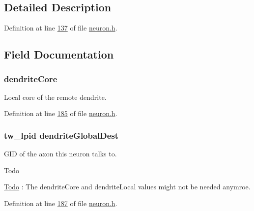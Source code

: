 \subsection{Detailed Description}


Definition at line \hyperlink{neuron_8h_source_l00137}{137} of file \hyperlink{neuron_8h_source}{neuron.\+h}.



\subsection{Field Documentation}
\hypertarget{structneuron_state_a62463fa4d33c39297aa5ce3a145d474f}{}
\subsubsection[{dendrite\+Core}]{ dendrite\+Core}\label{structneuron_state_a62463fa4d33c39297aa5ce3a145d474f}


Local core of the remote dendrite. 



Definition at line \hyperlink{neuron_8h_source_l00185}{185} of file \hyperlink{neuron_8h_source}{neuron.\+h}.

\hypertarget{structneuron_state_a4199c14c5aabfd52f441e01623bdc84c}{}
\subsubsection[{dendrite\+Global\+Dest}]{\setlength{\rightskip}{0pt plus 5cm}tw\+\_\+lpid dendrite\+Global\+Dest}\label{structneuron_state_a4199c14c5aabfd52f441e01623bdc84c}


G\+I\+D of the axon this neuron talks to. 

\begin{DoxyRefDesc}{Todo}
\item[\hyperlink{todo__todo000006}{Todo}]\+: The dendrite\+Core and dendrite\+Local values might not be needed anymroe. \end{DoxyRefDesc}


Definition at line \hyperlink{neuron_8h_source_l00187}{187} of file \hyperlink{neuron_8h_source}{neuron.\+h}.

